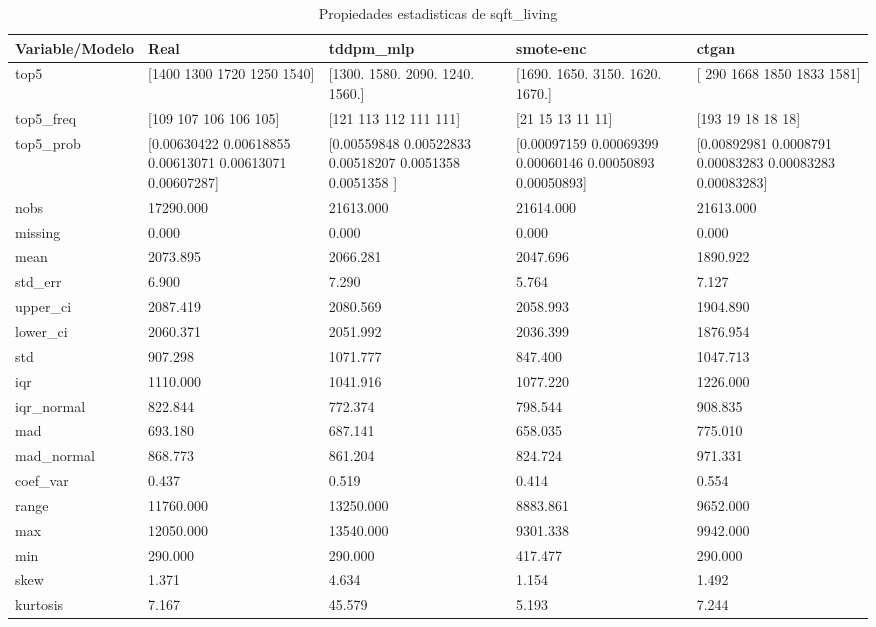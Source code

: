 \begin{table}[H]
\centering
\caption{Propiedades  estadisticas de sqft_living}
\label{table-stats-sqft_living}
\begin{tabular}{|l|m{10em}|m{10em}|m{10em}|m{10em}|}
\hline
 \rowcolor[gray]{0.8}
Variable/Modelo & Real & tddpm\_mlp & smote-enc & ctgan \\
\hline top5 & [1400 1300 1720 1250 1540] & [1300. 1580. 2090. 1240. 1560.] & [1690. 1650. 3150. 1620. 1670.] & [ 290 1668 1850 1833 1581] \\
\hline top5\_freq & [109 107 106 106 105] & [121 113 112 111 111] & [21 15 13 11 11] & [193  19  18  18  18] \\
\hline top5\_prob & [0.00630422 0.00618855 0.00613071 0.00613071 0.00607287] & [0.00559848 0.00522833 0.00518207 0.0051358  0.0051358 ] & [0.00097159 0.00069399 0.00060146 0.00050893 0.00050893] & [0.00892981 0.0008791  0.00083283 0.00083283 0.00083283] \\
\hline nobs & 17290.000 & 21613.000 & 21614.000 & 21613.000 \\
\hline missing & 0.000 & 0.000 & 0.000 & 0.000 \\
\hline mean & 2073.895 & 2066.281 & 2047.696 & 1890.922 \\
\hline std\_err & 6.900 & 7.290 & 5.764 & 7.127 \\
\hline upper\_ci & 2087.419 & 2080.569 & 2058.993 & 1904.890 \\
\hline lower\_ci & 2060.371 & 2051.992 & 2036.399 & 1876.954 \\
\hline std & 907.298 & 1071.777 & 847.400 & 1047.713 \\
\hline iqr & 1110.000 & 1041.916 & 1077.220 & 1226.000 \\
\hline iqr\_normal & 822.844 & 772.374 & 798.544 & 908.835 \\
\hline mad & 693.180 & 687.141 & 658.035 & 775.010 \\
\hline mad\_normal & 868.773 & 861.204 & 824.724 & 971.331 \\
\hline coef\_var & 0.437 & 0.519 & 0.414 & 0.554 \\
\hline range & 11760.000 & 13250.000 & 8883.861 & 9652.000 \\
\hline max & 12050.000 & 13540.000 & 9301.338 & 9942.000 \\
\hline min & 290.000 & 290.000 & 417.477 & 290.000 \\
\hline skew & 1.371 & 4.634 & 1.154 & 1.492 \\
\hline kurtosis & 7.167 & 45.579 & 5.193 & 7.244 \\

\end{tabular}
\end{table}

